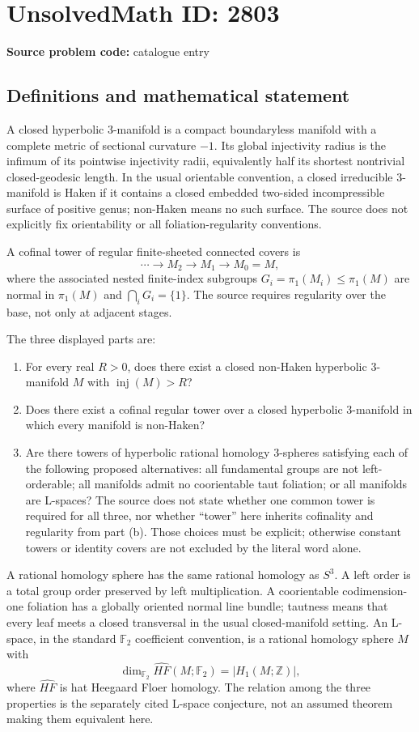 \documentclass[11pt]{article}
\newcommand{\Z}{\mathbb{Z}}
\newcommand{\F}{\mathbb{F}}
\begin{document}
\section*{UnsolvedMath ID: 2803}
\textbf{Source problem code:} catalogue entry
\subsection{Definitions and mathematical statement}
A closed hyperbolic $3$-manifold is a compact boundaryless manifold with a complete metric of sectional curvature $-1$. Its global injectivity radius is the infimum of its pointwise injectivity radii, equivalently half its shortest nontrivial closed-geodesic length. In the usual orientable convention, a closed irreducible $3$-manifold is Haken if it contains a closed embedded two-sided incompressible surface of positive genus; non-Haken means no such surface. The source does not explicitly fix orientability or all foliation-regularity conventions.

A cofinal tower of regular finite-sheeted connected covers is
\[
\cdots\longrightarrow M_2\longrightarrow M_1\longrightarrow M_0=M,
\]
where the associated nested finite-index subgroups $G_i=\pi_1(M_i)\leq\pi_1(M)$ are normal in $\pi_1(M)$ and $\bigcap_iG_i=\{1\}$. The source requires regularity over the base, not only at adjacent stages.

The three displayed parts are:
\begin{enumerate}
\item For every real $R>0$, does there exist a closed non-Haken hyperbolic $3$-manifold $M$ with $\operatorname{inj}(M)>R$?
\item Does there exist a cofinal regular tower over a closed hyperbolic $3$-manifold in which every manifold is non-Haken?
\item Are there towers of hyperbolic rational homology $3$-spheres satisfying each of the following proposed alternatives: all fundamental groups are not left-orderable; all manifolds admit no coorientable taut foliation; or all manifolds are L-spaces? The source does not state whether one common tower is required for all three, nor whether ``tower'' here inherits cofinality and regularity from part (b). Those choices must be explicit; otherwise constant towers or identity covers are not excluded by the literal word alone.
\end{enumerate}
A rational homology sphere has the same rational homology as $S^3$. A left order is a total group order preserved by left multiplication. A coorientable codimension-one foliation has a globally oriented normal line bundle; tautness means that every leaf meets a closed transversal in the usual closed-manifold setting. An L-space, in the standard $\F_2$ coefficient convention, is a rational homology sphere $M$ with
\[
\dim_{\F_2}\widehat{HF}(M;\F_2)=|H_1(M;\Z)|,
\]
where $\widehat{HF}$ is hat Heegaard Floer homology. The relation among the three properties is the separately cited L-space conjecture, not an assumed theorem making them equivalent here.
\end{document}
